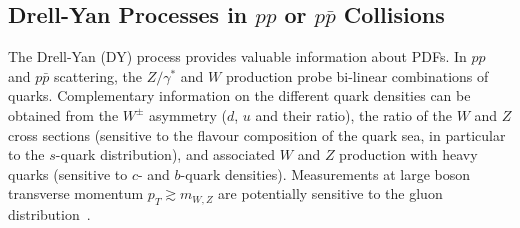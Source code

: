 %




\subsection{Drell-Yan Processes in $pp$ or $p\bar p$ Collisions}
\label{dysection}

The Drell-Yan (DY) process
provides valuable information about PDFs.
In $pp$ and $p\bar p$ scattering, the $Z/\gamma^*$ and $W$ production 
probe bi-linear combinations of quarks. 
Complementary information on the different quark densities
can be obtained from the $W^{\pm}$ asymmetry ($d$, $u$ and their ratio),
the ratio of the $W$ and $Z$ cross sections (sensitive to the flavour 
composition of the quark sea, in particular to the $s$-quark distribution), 
and associated $W$ and $Z$ production with
heavy quarks (sensitive to $c$- and $b$-quark densities).
 Measurements at large boson transverse momentum $p_T\gtrsim m_{W,Z}$ are potentially sensitive to the gluon 
distribution~\cite{Malik:2013kba}.
%

